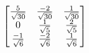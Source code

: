\documentclass[preview]{standalone}
\begin{document}
\begin{align*}
\special{dvisvgm:raw <g id='unique000'>}\begin{bmatrix}\frac{5}{\sqrt{30}} & \frac{-2}{\sqrt{30}} & \frac{1}{\sqrt{30}} \\0 & \frac{1}{\sqrt{5}} & \frac{2}{\sqrt{5}} \\\frac{-1}{\sqrt{6}} & \frac{-2}{\sqrt{6}} & \frac{1}{\sqrt{6}}\end{bmatrix}\special{dvisvgm:raw </g>}
\end{align*}
\end{document}
